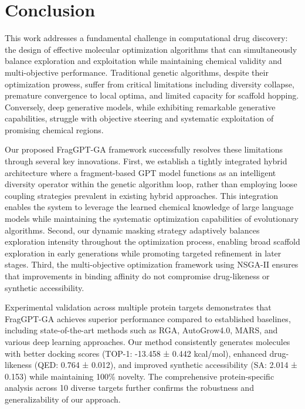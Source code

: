 \documentclass[lettersize,journal]{IEEEtran}
\begin{document}
\section{Conclusion}

This work addresses a fundamental challenge in computational drug discovery: the design of effective molecular optimization algorithms that can simultaneously balance exploration and exploitation while maintaining chemical validity and multi-objective performance. Traditional genetic algorithms, despite their optimization prowess, suffer from critical limitations including diversity collapse, premature convergence to local optima, and limited capacity for scaffold hopping. Conversely, deep generative models, while exhibiting remarkable generative capabilities, struggle with objective steering and systematic exploitation of promising chemical regions.

Our proposed FragGPT-GA framework successfully resolves these limitations through several key innovations. First, we establish a tightly integrated hybrid architecture where a fragment-based GPT model functions as an intelligent diversity operator within the genetic algorithm loop, rather than employing loose coupling strategies prevalent in existing hybrid approaches. This integration enables the system to leverage the learned chemical knowledge of large language models while maintaining the systematic optimization capabilities of evolutionary algorithms. Second, our dynamic masking strategy adaptively balances exploration intensity throughout the optimization process, enabling broad scaffold exploration in early generations while promoting targeted refinement in later stages. Third, the multi-objective optimization framework using NSGA-II ensures that improvements in binding affinity do not compromise drug-likeness or synthetic accessibility.

Experimental validation across multiple protein targets demonstrates that FragGPT-GA achieves superior performance compared to established baselines, including state-of-the-art methods such as RGA, AutoGrow4.0, MARS, and various deep learning approaches. Our method consistently generates molecules with better docking scores (TOP-1: -13.458 ± 0.442 kcal/mol), enhanced drug-likeness (QED: 0.764 ± 0.012), and improved synthetic accessibility (SA: 2.014 ± 0.153) while maintaining 100\% novelty. The comprehensive protein-specific analysis across 10 diverse targets further confirms the robustness and generalizability of our approach.
\end{document}
